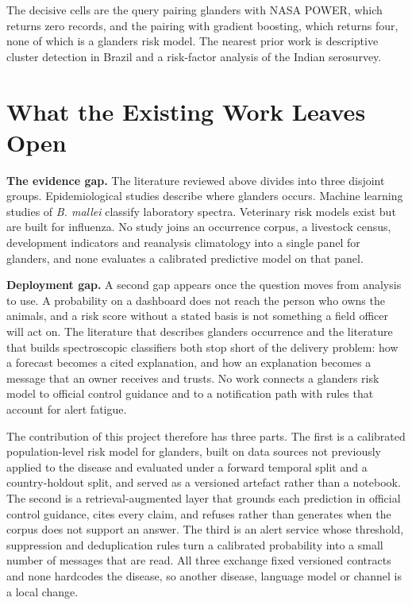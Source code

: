 \documentclass[10pt,openany]{report}
\begin{document}
The decisive cells are the query pairing glanders with NASA POWER, which returns zero records,
and the pairing with gradient boosting, which returns four, none of which is a glanders risk
model. The nearest prior work is descriptive cluster detection in Brazil and a risk-factor
analysis of the Indian serosurvey.

\section{What the Existing Work Leaves Open}

\textbf{The evidence gap.} The literature reviewed above divides into three disjoint groups.
Epidemiological studies describe where glanders occurs. Machine learning studies of
\textit{B. mallei} classify laboratory spectra. Veterinary risk models exist but are built for
influenza. No study joins an occurrence corpus, a livestock census, development indicators and
reanalysis climatology into a single panel for glanders, and none evaluates a calibrated predictive
model on that panel.

\textbf{Deployment gap.} A second gap appears once the question moves from analysis to use. A
probability on a dashboard does not reach the person who owns the animals, and a risk score without
a stated basis is not something a field officer will act on. The literature that describes glanders
occurrence and the literature that builds spectroscopic classifiers both stop short of the delivery
problem: how a forecast becomes a cited explanation, and how an explanation becomes a message that
an owner receives and trusts. No work connects a glanders risk model to official control guidance
and to a notification path with rules that account for alert fatigue.

The contribution of this project therefore has three parts. The first is a calibrated
population-level risk model for glanders, built on data sources not previously applied to the
disease and evaluated under a forward temporal split and a country-holdout split, and served as a
versioned artefact rather than a notebook. The second is a retrieval-augmented layer that grounds
each prediction in official control guidance, cites every claim, and refuses rather than generates
when the corpus does not support an answer. The third is an alert service whose threshold,
suppression and deduplication rules turn a calibrated probability into a small number of messages
that are read. All three exchange fixed versioned contracts and none hardcodes the disease, so
another disease, language model or channel is a local change.
\end{document}
